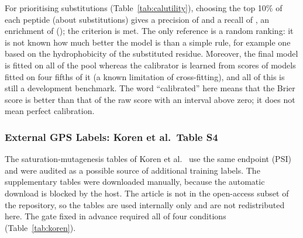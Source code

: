 \begin{table}[htbp]
  \centering
  \caption{Ranking utility: the substitutions of each peptide (532 per 28-residue peptide) are ordered by the raw score. A random ranking has
  enrichment 1.}\label{tab:calutility}
  
\end{table}

For prioritising substitutions (Table~\ref{tab:calutility}), choosing the top 10\% of each peptide (about \nKTen{} substitutions) gives a precision of \nPrecTen{} and
a recall of \nRecTen{}, an enrichment of \nEnrTen{} (\nEnrTenCI{}); the criterion is met. The only reference is a random ranking: it is not known
how much better the model is than a simple rule, for example one based on the hydrophobicity of the substituted residue. Moreover, the final model is fitted on
all of the pool whereas the calibrator is learned from scores of models fitted on four fifths of it (a known limitation of cross-fitting), and all of this is
still a development benchmark. The word ``calibrated'' here means that the Brier score is better than that of the raw score with an interval above zero; it does
not mean perfect calibration.

\subsubsection{External GPS Labels: Koren et al.\ Table S4}\label{sec:res-koren}
The saturation-mutagenesis tables of Koren et al.\ \citep{koren2018} use the same endpoint (PSI) and were audited as a possible source of additional training labels.
The supplementary tables were downloaded manually, because the automatic download is blocked by the host. The article is not in the open-access subset of the
repository, so the tables are used internally only and are not redistributed here. The gate fixed in advance required all of four conditions (Table~\ref{tab:koren}).

\begin{table}[htbp]
  \centering
  \caption{Gate fixed in advance for merging the labels of Koren et al.\ (Table S4) into training}\label{tab:koren}
  
\end{table}


